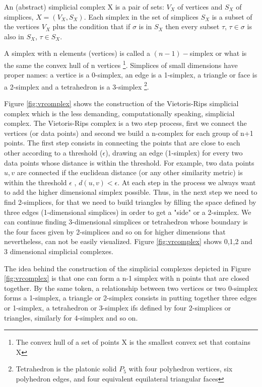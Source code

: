 \documentclass[onecollarge,runningheads]{svjour2}
\begin{document}
\begin{definition}
An (abstract) simplicial complex X is a pair of sets: $V_X$ of vertices and $S_X$ of simplices, $X=(V_X,S_X)$. Each simplex in the set of simplices $S_X$ is a subset of the vertices $V_X$ plus the condition that if $\sigma$ is in $S_X$ then every subset $\tau$, $\tau \in \sigma$ is also in $S_X$, $\tau \in S_X$.
\end{definition}

A simplex with n elements (vertices) is called a $(n-1)-$simplex or what is the same the convex hull of n vertices \footnote{The convex hull of a set of points X is the smallest convex set that contains X}. Simplices of small dimensions have proper names: a vertice is a 0-simplex, an edge is a 1-simplex, a triangle or face is a 2-simplex and a tetrahedron is a 3-simplex \footnote{Tetrahedron is the platonic solid $P_5$ with four polyhedron vertices, six polyhedron edges, and four equivalent equilateral triangular faces}.

Figure \ref{fig:vrcomplex} shows the construction of the Vietoris-Rips simplicial complex \cite{hausmann1995vietoris} which is the less demanding, computationally speaking, simplicial complex. The Vietoris-Rips complex is a two step process, first we connect the vertices (or data points) and second we build a n-complex for each group of n+1 points. The first step consists in connecting the points that are close to each other according to a threshold ($\epsilon$), drawing an edge (1-simplex) for every two data points whose distance is within the threshold. For example, two data points $u,v$ are connected if the euclidean distance (or any other similarity metric) is within the threshold $\epsilon$ , $d(u,v) < \epsilon$. At each step in the process we always want to add the higher dimensional simplex possible. Thus, in the next step we need to find 2-simplices, for that we need to build triangles by filling the space defined by three edges (1-dimensional simplices) in order to get a "side" or a 2-simplex. We can continue finding 3-dimensional simplices or tetrahedron whose boundary is the four faces given by 2-simplices and so on for higher dimensions that nevertheless, can not be easily visualized. Figure \ref{fig:vrcomplex} shows 0,1,2 and 3 dimensional simplicial complexes.

The idea behind the construction of the simplicial complexes depicted in Figure \ref{fig:vrcomplex} is that one can form a n-1 simplex with n points that are closed together. By the same token, a relationship between two vertices or two 0-simplex forms a 1-simplex, a triangle or 2-simplex consists in putting together three edges or 1-simplex, a tetrahedron or 3-simplex ifs defined by four 2-simplices or triangles, similarly for 4-simplex and so on.
\end{document}
